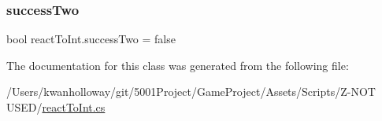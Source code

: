 \subsubsection{\texorpdfstring{success\+Two}{successTwo}}
{\footnotesize\ttfamily bool react\+To\+Int.\+success\+Two = false}



The documentation for this class was generated from the following file\+:\begin{DoxyCompactItemize}
\item 
/\+Users/kwanholloway/git/5001\+Project/\+Game\+Project/\+Assets/\+Scripts/\+Z-\/\+N\+O\+T U\+S\+E\+D/\hyperlink{react_to_int_8cs}{react\+To\+Int.\+cs}\end{DoxyCompactItemize}
